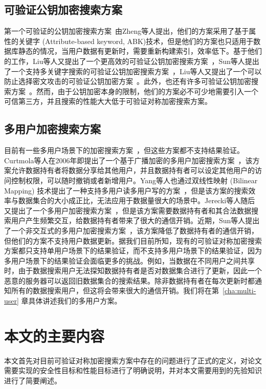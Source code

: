 \subsection{可验证公钥加密搜索方案}
第一个可验证的公钥加密搜索方案~\cite{zheng2014vabks}由Zheng等人提出，他们的方案采用了基于属性的关键字 (Attribute-based keyword, ABK)技术，但是他们的方案也只适用于数据库静态的情况，当用户数据有更新时，需要重新构建索引，效率低下。基于他们的工作，Liu等人又提出了一个更高效的可验证公钥加密搜索方案~\cite{liu2014efficient}，Sun等人提出了一个支持多关键字搜索的可验证公钥加密搜索方案~\cite{sun2015catch}，Liu等人又提出了一个可以防止选择密文攻击的可验证公钥加密方案~\cite{liu2015cca}。此外，也还有许多可验证公钥加密搜索方案~\cite{ameri2015generic,zhang2016pvsae}。然而，由于公钥加密本身的限制，他们的方案必不可少地需要引入一个可信第三方，并且搜索的性能大大低于可验证对称加密搜索方案。

\subsection{多用户加密搜索方案}
目前有一些多用户场景下的加密搜索方案~\cite{curtmola2011searchable,yang2009multiuser,jarecki2013outsourced,sun2016efficient}，但这些方案都不支持结果验证。Curtmola等人在2006年即提出了一个基于广播加密的多用户加密搜索方案~\cite{curtmola2011searchable}，该方案允许数据持有者将数据分享给其他用户，并且数据持有者可以设定其他用户的访问控制权限，可以随时撤销或者新增用户。Yang等人也通过双线性映射 (Bilinear Mapping) 技术提出了一种支持多用户读多用户写的方案~\cite{yang2009multiuser}，但是该方案的搜索效率与数据集合的大小成正比，无法应用于数据量很大的场景中。Jerecki等人随后又提出了一个多用户加密搜索方案~\cite{jarecki2013outsourced}，但是该方案需要数据持有者和其合法数据搜索用户产生频繁交互，给数据持有者带来了很大的通信开销。近期，Sun等人提出了一个非交互式的多用户加密搜索方案~\cite{sun2016efficient}，该方案降低了数据持有者的通信开销，但他们的方案不支持用户数据更新。据我们目前所知，现有的可验证对称加密搜索方案都只支持单用户场景下的结果验证，而不支持多用户场景下的结果验证，因为多用户场景下的结果验证会面临更多的挑战。例如，当数据在不同用户之间共享时，由于数据搜索用户无法探知数据持有者是否对数据集合进行了更新，因此一个恶意的服务器可以返回旧数据集合的搜索结果。除非数据持有者在每次更新时都通知所有的数据搜索用户，但这将会带来很大的通信开销。我们将在第~\ref{cha:multi-user} 章具体讲述我们的多用户方案。


\section{本文的主要内容}
本文首先对目前可验证对称加密搜索方案中存在的问题进行了正式的定义，对论文需要实现的安全性目标和性能目标进行了明确说明，并对本文需要用到的先验知识进行了简要阐述。

